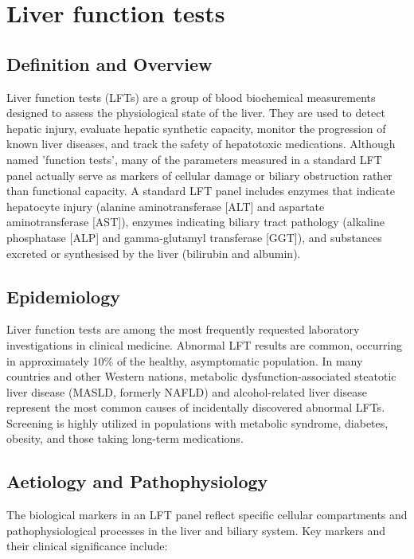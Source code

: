 \chapter{Liver function tests}

\section*{Definition and Overview}
Liver function tests (LFTs) are a group of blood biochemical measurements designed to assess the physiological state of the liver. They are used to detect hepatic injury, evaluate hepatic synthetic capacity, monitor the progression of known liver diseases, and track the safety of hepatotoxic medications. Although named 'function tests', many of the parameters measured in a standard LFT panel actually serve as markers of cellular damage or biliary obstruction rather than functional capacity. A standard LFT panel includes enzymes that indicate hepatocyte injury (alanine aminotransferase [ALT] and aspartate aminotransferase [AST]), enzymes indicating biliary tract pathology (alkaline phosphatase [ALP] and gamma-glutamyl transferase [GGT]), and substances excreted or synthesised by the liver (bilirubin and albumin).

\section*{Epidemiology}
Liver function tests are among the most frequently requested laboratory investigations in clinical medicine. Abnormal LFT results are common, occurring in approximately 10\% of the healthy, asymptomatic population. In many countries and other Western nations, metabolic dysfunction-associated steatotic liver disease (MASLD, formerly NAFLD) and alcohol-related liver disease represent the most common causes of incidentally discovered abnormal LFTs. Screening is highly utilized in populations with metabolic syndrome, diabetes, obesity, and those taking long-term medications.

\section*{Aetiology and Pathophysiology}
The biological markers in an LFT panel reflect specific cellular compartments and pathophysiological processes in the liver and biliary system. Key markers and their clinical significance include:

